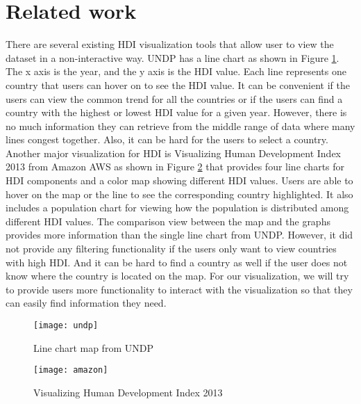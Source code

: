 \section{Related work}
There are several existing HDI visualization tools that allow user to view the dataset in a non-interactive way. UNDP has a line chart as shown in Figure \ref{fig:undp}. The x axis is the year, and the y axis is the HDI value.  Each line represents one country that users can hover on to see the HDI value. It can be convenient if the users can view the common trend for all the countries or if the users can find a country with the highest or lowest HDI value for a given year. However, there is no much information they can retrieve from the middle range of data where many lines congest together. Also, it can be hard for the users to select a country. Another major visualization for HDI is Visualizing Human Development Index 2013 from Amazon AWS as shown in Figure \ref{fig:amazon} that provides four line charts for HDI components and a color map showing different HDI values. Users are able to hover on the map or the line to see the corresponding country highlighted. It also includes a population chart for viewing how the population is distributed among different HDI values.  The comparison view between the map and the graphs provides more information than the single line chart from UNDP. However, it did not provide any filtering functionality if the users only want to view countries with high HDI. And it can be hard to find a country as well if the user does not know where the country is located on the map. For our visualization, we will try to provide users more functionality to interact with the visualization so that they can easily find information they need.
\begin{figure}[t]
	\centering
	\texttt{[image: undp]}
	\caption{Line chart map from UNDP}
	\label{fig:undp}
\end{figure}
\begin{figure}[t]
	\centering
	\texttt{[image: amazon]}
	\caption{Visualizing Human Development Index 2013}
	\label{fig:amazon}
\end{figure}
